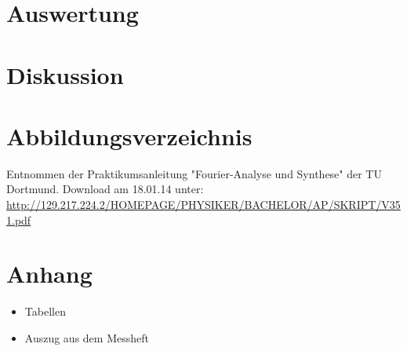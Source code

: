 \documentclass[11pt,ngerman,a4paper]{article}
\begin{document}
\section{Auswertung}

\section{Diskussion}

\section{Abbildungsverzeichnis}
\begin{enumerate}[{[}1{]}]
\item Entnommen der Praktikumsanleitung "Fourier-Analyse und Synthese" der TU Dortmund. Download am 18.01.14 unter:\\
 \url{http://129.217.224.2/HOMEPAGE/PHYSIKER/BACHELOR/AP/SKRIPT/V351.pdf}
\end{enumerate}
\section{Anhang}
\begin{itemize}
\item Tabellen
\item Auszug aus dem Messheft
\end{itemize}
\end{document}
